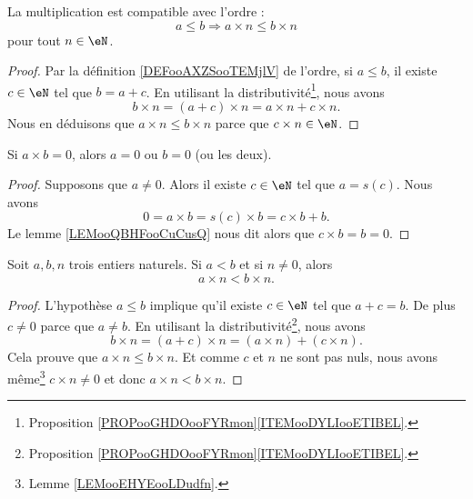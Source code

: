 \begin{lemma}	\label{LEMooCompatMultiplicationOrdre}
	La multiplication est compatible avec l'ordre :
	\begin{equation}
		a\leq b\Rightarrow a\times n\leq b\times n
	\end{equation}
	pour tout \( n\in \eN\).
\end{lemma}

\begin{proof}
	Par la définition \ref{DEFooAXZSooTEMjlV} de l'ordre, si \( a\leq b\), il existe \( c\in \eN\) tel que \( b=a+c\). En utilisant la distributivité\footnote{Proposition \ref{PROPooGHDOooFYRmon}\ref{ITEMooDYLIooETIBEL}.}, nous avons
	\begin{equation}
		b\times n=(a+c)\times n=a\times n+c\times n.
	\end{equation}
	Nous en déduisons que \( a\times n\leq b\times n\) parce que \( c\times n \in \eN\).
\end{proof}

\begin{lemma}       \label{LEMooEHYEooLDudfn}
	Si \( a\times b=0\), alors \( a=0\) ou \( b=0\) (ou les deux).
\end{lemma}

\begin{proof}
	Supposons que \( a\neq 0\). Alors il existe \( c\in \eN\) tel que \( a=s(c)\). Nous avons
	\begin{equation}
		0=a\times b=s(c)\times b=c\times b+b.
	\end{equation}
	Le lemme \ref{LEMooQBHFooCuCusQ} nous dit alors que \( c\times b=b=0\).
\end{proof}

\begin{lemma}        \label{LEMooGUXGooBcKJdS}
	Soit \(a, b, n\) trois entiers naturels. Si \( a< b\) et si \( n\neq 0\), alors
	\begin{equation}
		a\times n<b\times n.
	\end{equation}
\end{lemma}

\begin{proof}
	L'hypothèse \( a\leq b\) implique qu'il existe \( c\in \eN\) tel que \( a+c=b\). De plus \( c\neq 0\) parce que \( a\neq b\). En utilisant la distributivité\footnote{Proposition \ref{PROPooGHDOooFYRmon}\ref{ITEMooDYLIooETIBEL}.}, nous avons
	\begin{equation}
		b\times n=(a+c)\times n=(a\times n)+(c\times n).
	\end{equation}
	Cela prouve que \( a\times n\leq b\times n\). Et comme \( c\) et \( n\) ne sont pas nuls, nous avons même\footnote{Lemme \ref{LEMooEHYEooLDudfn}.} \( c\times n\neq 0\) et donc \( a\times n<b\times n\).
\end{proof}

